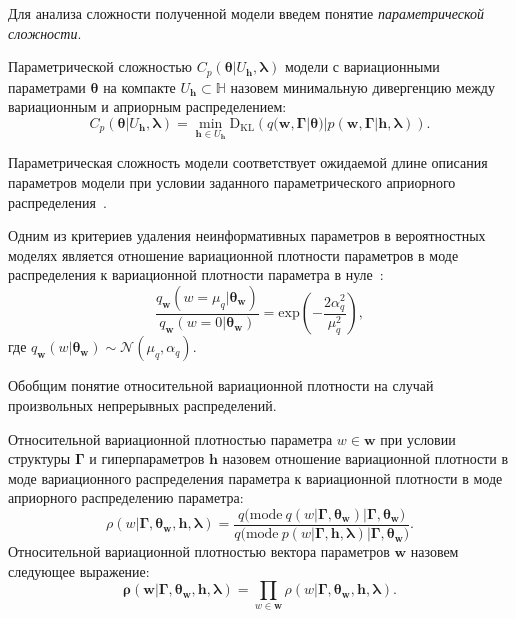 Для анализа сложности полученной модели введем понятие \textit{параметрической сложности}. 
\begin{defin} 
Параметрической сложностью  $C_p(\boldsymbol{\theta}|U_\mathbf{h},\boldsymbol{\lambda})$ модели с вариационными параметрами $\boldsymbol{\theta}$ на компакте $U_\mathbf{h} \subset \mathbb{H}$ назовем минимальную дивергенцию между вариационным и априорным распределением:
\[
C_p(\boldsymbol{\theta}|U_\mathbf{h},\boldsymbol{\lambda}) = \min_{\mathbf{h} \in U_\mathbf{h}} \text{D}_\text{KL}\left(q(\mathbf{w}, \boldsymbol{\Gamma}|\boldsymbol{\theta})|p(\mathbf{w}, \boldsymbol{\Gamma}|\mathbf{h},\boldsymbol{\lambda})\right).
\]
\end{defin}
Параметрическая сложность модели соответствует ожидаемой длине описания параметров модели при условии заданного параметрического априорного распределения~\cite{hinton_mdl}.

Одним из критериев удаления неинформативных параметров в вероятностных моделях является отношение вариационной плотности параметров в моде распределения к вариационной плотности параметра в нуле~\cite{nips}:
\[\frac{q_\mathbf{w}(w=\mu_q|\boldsymbol{\theta}_\mathbf{w})}{q_\mathbf{w}(w=0|\boldsymbol{\theta}_\mathbf{w})}= \text{exp}\left(-\frac{2\alpha_q^2}{\mu_q^2}\right),
\]
где $q_\mathbf{w}(w|\boldsymbol{\theta}_\mathbf{w}) \sim \mathcal{N}(\mu_q, \alpha_q).$

Обобщим понятие относительной вариационной плотности на случай произвольных непрерывных распределений.
\begin{defin}
Относительной вариационной   плотностью параметра $w \in \mathbf{w}$  при условии структуры $\boldsymbol{\Gamma}$ и гиперпараметров $\mathbf{h}$ назовем отношение вариационной плотности в моде вариационного распределения параметра к вариационной плотности в моде априорного распределению параметра:
\[\rho(w|\boldsymbol{\Gamma},\boldsymbol{\theta}_\mathbf{w}, \mathbf{h},\boldsymbol{\lambda})=\frac{q\bigl(\text{mode}~q\left(w|\boldsymbol{\Gamma}, \boldsymbol{\theta}_\mathbf{w}\right)|\boldsymbol{\Gamma}, \boldsymbol{\theta}_\mathbf{w}\bigr)}{q\bigl(\text{mode}~p\left({w}|\boldsymbol{\Gamma}, \mathbf{h},\boldsymbol{\lambda}\right)|\boldsymbol{\Gamma},\boldsymbol{\theta}_\mathbf{w}\bigr)}.\]
Относительной вариационной плотностью вектора параметров $\mathbf{w}$ назовем следующее выражение:
\[
    \boldsymbol{\rho}(\mathbf{w}|\boldsymbol{\Gamma}, \boldsymbol{\theta}_\mathbf{w}, \mathbf{h},\boldsymbol{\lambda}) = \prod_{w \in \mathbf{w}}\rho(w|\boldsymbol{\Gamma}, \boldsymbol{\theta}_\mathbf{w}, \mathbf{h},\boldsymbol{\lambda}).
\]

\end{defin}

